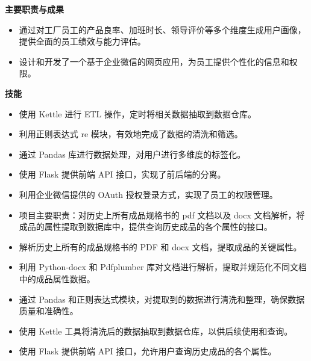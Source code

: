 \documentclass{resume}
\begin{document}
\begin{onehalfspacing}
\textbf{主要职责与成果}

\begin{itemize}
\item
通过对工厂员工的产品良率、加班时长、领导评价等多个维度生成用户画像，提供全面的员工绩效与能力评估。
\item
设计和开发了一个基于企业微信的网页应用，为员工提供个性化的信息和权限。
\end{itemize}

\textbf{技能}

\begin{itemize}
\item
使用 Kettle 进行 ETL 操作，定时将相关数据抽取到数据仓库。
\item
利用正则表达式 re 模块，有效地完成了数据的清洗和筛选。
\item
通过 Pandas 库进行数据处理，对用户进行多维度的标签化。
\item
使用 Flask 提供前端 API 接口，实现了前后端的分离。
\item
利用企业微信提供的 OAuth 授权登录方式，实现了员工的权限管理。
\end{itemize}
\end{onehalfspacing}

\begin{onehalfspacing}
\begin{itemize}
\item
项目主要职责：对历史上所有成品规格书的 pdf 文档以及 docx 文档解析，将成品的属性提取到数据库中，提供查询历史成品的各个属性的接口。
\item
解析历史上所有的成品规格书的 PDF 和 docx 文档，提取成品的关键属性。
\item
利用 Python-docx 和 Pdfplumber 库对文档进行解析，提取并规范化不同文档中的成品属性数据。
\item
通过 Pandas 和正则表达式模块，对提取到的数据进行清洗和整理，确保数据质量和准确性。
\item
使用 Kettle 工具将清洗后的数据抽取到数据仓库，以供后续使用和查询。
\item
使用 Flask 提供前端 API 接口，允许用户查询历史成品的各个属性。
\end{itemize}
\end{onehalfspacing}
\end{document}
